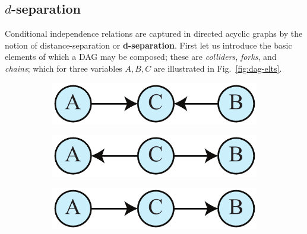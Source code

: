 \documentclass[12pt,onecolumn,nofootinbib]{revtex4-2}
\begin{document}
\begin{appendix}
\section{$d$-separation}
\label{app:dsep}

Conditional independence relations are captured in directed acyclic graphs by the notion of distance-separation or \textbf{d-separation}. First let us introduce the basic elements of which a DAG may be composed; these are \emph{colliders}, \emph{forks}, and \emph{chains}; which for three variables $A,B,C$ are illustrated in Fig.~\ref{fig:dag-elts}.
\newline
\begin{figure}[h]
	\begin{subfigure}[b]{0.18\textwidth}
                	\centering
                \includegraphics[width=\textwidth]{a-ind-b}
                	\label{fig:dag-collider}
        \end{subfigure}
	\hspace{5em}
        \begin{subfigure}[b]{0.18\textwidth}
                	\centering
                \includegraphics[width=\textwidth]{markovchain3}
                	\label{fig:dag-fork}
        \end{subfigure}
	\hspace{5em}
        \begin{subfigure}[b]{0.18\textwidth}
                	\centering
                	\includegraphics[width=\textwidth]{markovchain1}
		

\end{subfigure}
\end{figure}
\end{appendix}
\end{document}
